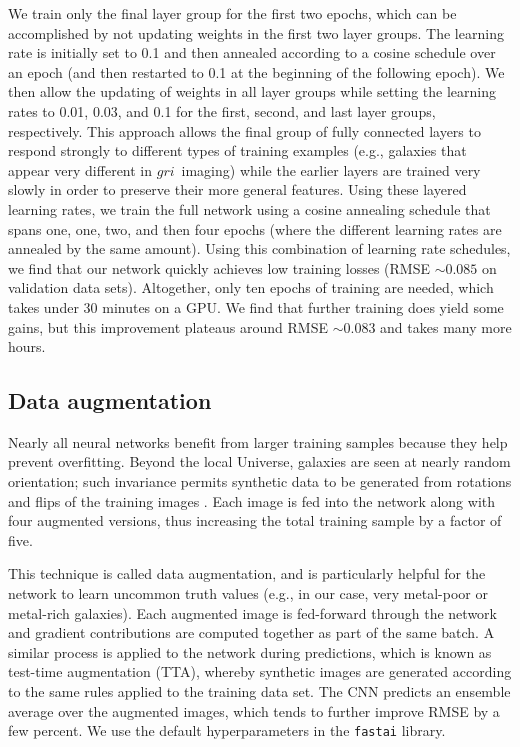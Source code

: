 \documentclass[fleqn,usenatbib]{mnras}
\newcommand{\sdssg}{\hbox{$g$}}
\newcommand{\sdssr}{\hbox{$r$}}
\newcommand{\sdssi}{\hbox{$i$}}
\newcommand{\eg}{e.g.}
\begin{document}
We train only the final layer group for the first two epochs, which can be accomplished by not updating weights in the first two layer groups. The learning rate is initially set to 0.1 and then annealed according to a cosine schedule over an epoch (and then restarted to 0.1 at the beginning of the following epoch). We then allow the updating of weights in all layer groups while setting the learning rates to 0.01, 0.03, and 0.1 for the first, second, and last layer groups, respectively. This approach allows the final group of fully connected layers to respond strongly to different types of training examples (\eg, galaxies that appear very different in \sdssg\sdssr\sdssi\ imaging) while the earlier layers are trained very slowly in order to preserve their more general features. Using these layered learning rates, we train the full network using a cosine annealing schedule that spans one, one, two, and then four epochs (where the different learning rates are annealed by the same amount). Using this combination of learning rate schedules, we find that our network quickly achieves low training losses (RMSE $\sim 0.085$ on validation data sets). Altogether, only ten epochs of training are needed, which takes under 30 minutes on a GPU. We find that further training does yield some gains, but this improvement plateaus around RMSE $\sim 0.083$ and takes many more hours.

\subsection{Data augmentation}\label{sec:data aug}
Nearly all neural networks benefit from larger training samples because they help prevent overfitting. Beyond the local Universe, galaxies are seen at nearly random orientation; such invariance permits synthetic data to be generated from rotations and flips of the training images \citep[see, \eg,][]{2014arXiv1409.1556S}. Each image is fed into the network along with four augmented versions, thus increasing the total training sample by a factor of five.

This technique is called data augmentation, and is particularly helpful for the network to learn uncommon truth values (\eg, in our case, very metal-poor or metal-rich galaxies). Each augmented image is fed-forward through the network and gradient contributions are computed together as part of the same batch. A similar process is applied to the network during predictions, which is known as test-time augmentation (TTA), whereby synthetic images are generated according to the same rules applied to the training data set. The CNN predicts an ensemble average over the augmented images, which tends to further improve RMSE by a few percent. We use the default hyperparameters in the \texttt{fastai} library.

\bsp	%
\label{lastpage}
\end{document}

